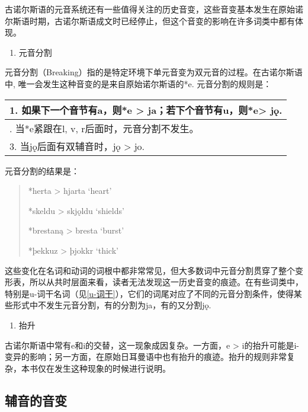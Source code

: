 古诺尔斯语的元音系统还有一些值得关注的历史音变，这些音变基本发生在原始诺尔斯语时期，古诺尔斯语成文时已经停止，但这个音变的影响在许多词类中都有体现。

\begin{enumerate}
  \def\labelenumi{\Alph{enumi}.}
  \setcounter{enumi}{3}
  \item
        元音分割
\end{enumerate}

元音分割（Breaking）指的是特定环境下单元音变为双元音的过程。在古诺尔斯语中,
唯一会发生这种音变的是来自原始诺尔斯语的*e. 元音分割的规则是：

\begin{longtable}{l}
  \toprule
  1. 如果下一个音节有a，则*e \textgreater{} ja；若下个音节有u，则*e\textgreater{} jǫ. \\
  \midrule
  \endhead
  \bottomrule
  \endfoot
  2. 当*e紧跟在l, v, r后面时，元音分割不发生。                                     \\
  3. 当jǫ后面有双辅音时，jǫ \textgreater{} jo.                              \\
\end{longtable}

元音分割的结果是：

\begin{quote}
  *herta \textgreater{} hjarta `heart'

  *skeldu \textgreater{} skjǫldu `shields'

  *brestaną \textgreater{} bresta `burst'

  *þekkuz \textgreater{} þjokkr `thick'
\end{quote}

这些变化在名词和动词的词根中都非常常见，但大多数词中元音分割贯穿了整个变形表，所以从共时层面来看，读者无法发现这一历史音变的痕迹。在有些词类中，特别是u-词干名词（见\ref{u-词干}），它们的词尾对应了不同的元音分割条件，使得某些形式中不发生元音分割，有的分割为ja，有的又分割jǫ.

\begin{enumerate}
  \def\labelenumi{\Alph{enumi}.}
  \setcounter{enumi}{4}
  \item
        抬升
\end{enumerate}

古诺尔斯语中常有e和i的交替，这一现象成因复杂。一方面，e \textgreater{}
i的抬升可能是i-变异的影响；另一方面，在原始日耳曼语中也有抬升的痕迹。抬升的规则非常复杂，本书仅在发生这种现象的时候进行说明。

\subsection{辅音的音变}\label{辅音的音变}

